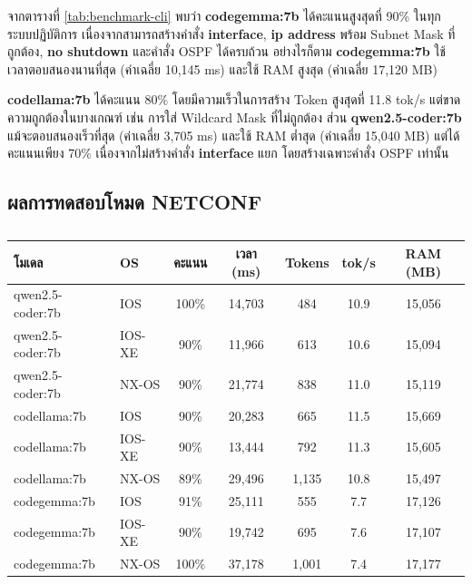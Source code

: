 \hspace*{1.3em}
จากตารางที่ \ref{tab:benchmark-cli} พบว่า \textbf{codegemma:7b} ได้คะแนนสูงสุดที่ 90\% ในทุกระบบปฏิบัติการ เนื่องจากสามารถสร้างคำสั่ง \textbf{interface}, \textbf{ip address} พร้อม Subnet Mask ที่ถูกต้อง, \textbf{no shutdown} และคำสั่ง OSPF ได้ครบถ้วน อย่างไรก็ตาม \textbf{codegemma:7b} ใช้เวลาตอบสนองนานที่สุด (ค่าเฉลี่ย 10,145 ms) และใช้ RAM สูงสุด (ค่าเฉลี่ย 17,120 MB)

\hspace*{1.3em}
\textbf{codellama:7b} ได้คะแนน 80\% โดยมีความเร็วในการสร้าง Token สูงสุดที่ 11.8 tok/s แต่ขาดความถูกต้องในบางเกณฑ์ เช่น การใส่ Wildcard Mask ที่ไม่ถูกต้อง ส่วน \textbf{qwen2.5-coder:7b} แม้จะตอบสนองเร็วที่สุด (ค่าเฉลี่ย 3,705 ms) และใช้ RAM ต่ำสุด (ค่าเฉลี่ย 15,040 MB) แต่ได้คะแนนเพียง 70\% เนื่องจากไม่สร้างคำสั่ง \textbf{interface} แยก โดยสร้างเฉพาะคำสั่ง OSPF เท่านั้น

\subsection{ผลการทดสอบโหมด NETCONF}

\begin{table}[H]
    \caption{}
    \label{tab:benchmark-netconf}
    \fontSixTeen
    \centering
    \begin{tabularx}{\textwidth}{|l|l|c|c|c|c|c|}
        \hline
        \textbf{โมเดล} & \textbf{OS} & \textbf{คะแนน} & \textbf{เวลา (ms)} & \textbf{Tokens} & \textbf{tok/s} & \textbf{RAM (MB)} \\
        \hline
        qwen2.5-coder:7b & IOS & 100\% & 14,703 & 484 & 10.9 & 15,056 \\
        \hline
        qwen2.5-coder:7b & IOS-XE & 90\% & 11,966 & 613 & 10.6 & 15,094 \\
        \hline
        qwen2.5-coder:7b & NX-OS & 90\% & 21,774 & 838 & 11.0 & 15,119 \\
        \hline
        codellama:7b & IOS & 90\% & 20,283 & 665 & 11.5 & 15,669 \\
        \hline
        codellama:7b & IOS-XE & 90\% & 13,444 & 792 & 11.3 & 15,605 \\
        \hline
        codellama:7b & NX-OS & 89\% & 29,496 & 1,135 & 10.8 & 15,497 \\
        \hline
        codegemma:7b & IOS & 91\% & 25,111 & 555 & 7.7 & 17,126 \\
        \hline
        codegemma:7b & IOS-XE & 90\% & 19,742 & 695 & 7.6 & 17,107 \\
        \hline
        codegemma:7b & NX-OS & 100\% & 37,178 & 1,001 & 7.4 & 17,177 \\
        \hline
    \end{tabularx}
\end{table}

